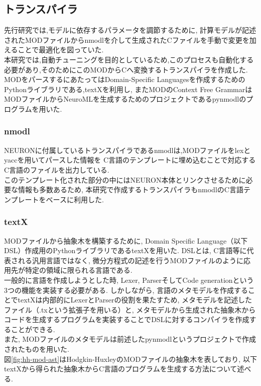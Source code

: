 \subsection{トランスパイラ}
先行研究\cite{miyamoto-master}では,モデルに依存するパラメータを調節するために,
計算モデルが記述されたMODファイルからnmodlを介して生成されたCファイルを手動で変更を加えることで最適化を図っていた.\\
本研究では,自動チューニングを目的としているため,このプロセスも自動化する必要があり,そのためにこのMODからCへ変換するトランスパイラを作成した.\\
MODをパースするにあたってはDomain-Specific Languagesを作成するためのPythonライブラリである,textX\cite{textX-repo}を利用し,
またMODのContext Free GrammarはMODファイルからNeuroMLを生成するためのプロジェクトであるpynmodl\cite{pynmodl-repo}のプログラムを用いた.\\

\subsubsection{nmodl}
NEURONに付属しているトランスパイラであるnmodlは,MODファイルをlexとyacc\cite{lex}を用いてパースした情報を
C言語のテンプレートに埋め込むことで対応するC言語のファイルを出力している.\\
このテンプレート化された部分の中にはNEURON本体とリンクさせるために必要な情報も多数あるため,
本研究で作成するトランスパイラもnmodlのC言語テンプレートをベースに利用した.\\

\subsubsection{textX}
MODファイルから抽象木を構築するために, Domain Specific Language（以下DSL）作成用のPythonライブラリであるtextX\cite{textX}を用いた.
DSLとは, C言語等に代表される汎用言語ではなく, 微分方程式の記述を行うMODファイルのように応用先が特定の領域に限られる言語である.\\
一般的に言語を作成しようとした時, Lexer, ParserそしてCode generationという3つの機能を実装する必要がある.
しかしながら, 言語のメタモデルを作成することでtextXは内部的にLexerとParserの役割を果たすため,
メタモデルを記述したファイル（.txという拡張子を用いる）と, メタモデルから生成された抽象木からコードを生成するプログラムを実装することでDSLに対するコンパイラを作成することができる.\\
また, MODファイルのメタモデルは前述したpynmodlというプロジェクトで作成されたものを用いた.\\
図\ref{fig:hh-mod-ast}はHodgkin-HuxleyのMODファイルの抽象木を表しており, 以下textXから得られた抽象木からC言語のプログラムを生成する方法について述べる.\\

